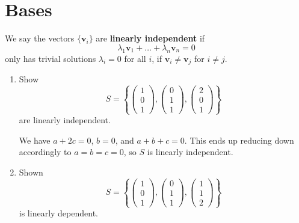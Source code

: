 \documentclass[letter-paper]{tufte-book}
\newenvironment{example}[1][Example]{\begin{trivlist}
\item[\hskip \labelsep {\bfseries #1}]}{\end{trivlist}}
\newcommand{\vb}{{\boldsymbol{v}}}
\begin{document}

\section{Bases}

We say the vectors $\{\vb_i\}$ are \textbf{linearly independent} if
\begin{equation}
  \lambda_1 \vb_1 + \ldots + \lambda_n \vb_n = 0
\end{equation}
only has trivial solutions $\lambda_i = 0$ for all $i$, if $\vb_i \neq \vb_j$
for $i\neq j$.

\begin{example}
  \begin{enumerate}
    \item Show
    \begin{equation*}
      S = \left\{\begin{pmatrix}1 \\ 0\\ 1\end{pmatrix}, \begin{pmatrix}0 \\ 1\\ 1\end{pmatrix}, \begin{pmatrix}2 \\ 0\\ 1\end{pmatrix}\right\}
    \end{equation*}
    are linearly independent.
    
    We have $a+2c = 0$, $b=0$, and $a+b+c=0$. This ends up reducing down
    accordingly to $a=b=c=0$, so $S$ is linearly independent.
    
    \item Shown
    \begin{equation*}
      S = \left\{\begin{pmatrix}1 \\ 0\\ 1\end{pmatrix}, \begin{pmatrix}0 \\ 1\\ 1\end{pmatrix}, \begin{pmatrix}1 \\ 1\\ 2\end{pmatrix}\right\}
    \end{equation*}
    is linearly dependent.
    

\end{enumerate}
\end{example}
\end{document}
